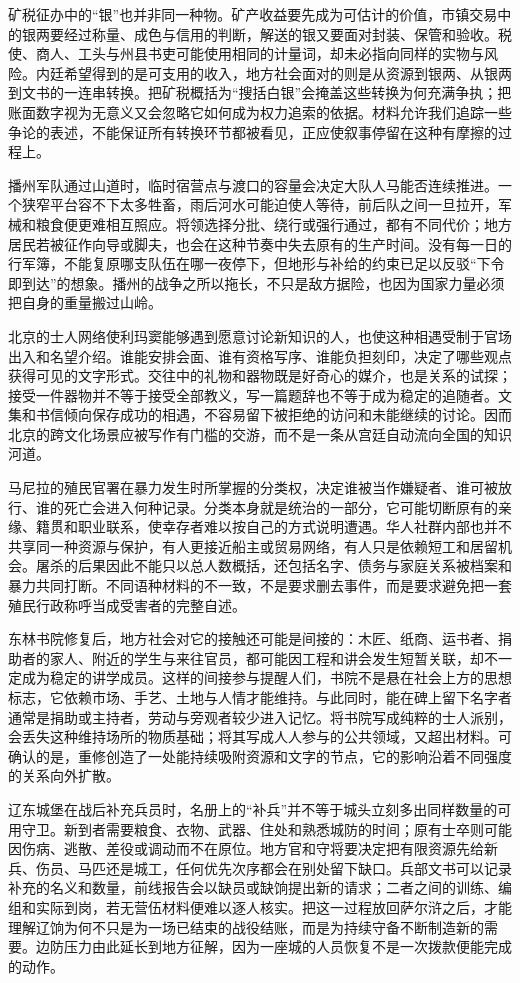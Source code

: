 矿税征办中的“银”也并非同一种物。矿产收益要先成为可估计的价值，市镇交易中的银两要经过称量、成色与信用的判断，解送的银又要面对封装、保管和验收。税使、商人、工头与州县书吏可能使用相同的计量词，却未必指向同样的实物与风险。内廷希望得到的是可支用的收入，地方社会面对的则是从资源到银两、从银两到文书的一连串转换。把矿税概括为“搜括白银”会掩盖这些转换为何充满争执；把账面数字视为无意义又会忽略它如何成为权力追索的依据。材料允许我们追踪一些争论的表述，不能保证所有转换环节都被看见，正应使叙事停留在这种有摩擦的过程上。

播州军队通过山道时，临时宿营点与渡口的容量会决定大队人马能否连续推进。一个狭窄平台容不下太多牲畜，雨后河水可能迫使人等待，前后队之间一旦拉开，军械和粮食便更难相互照应。将领选择分批、绕行或强行通过，都有不同代价；地方居民若被征作向导或脚夫，也会在这种节奏中失去原有的生产时间。没有每一日的行军簿，不能复原哪支队伍在哪一夜停下，但地形与补给的约束已足以反驳“下令即到达”的想象。播州的战争之所以拖长，不只是敌方据险，也因为国家力量必须把自身的重量搬过山岭。

北京的士人网络使利玛窦能够遇到愿意讨论新知识的人，也使这种相遇受制于官场出入和名望介绍。谁能安排会面、谁有资格写序、谁能负担刻印，决定了哪些观点获得可见的文字形式。交往中的礼物和器物既是好奇心的媒介，也是关系的试探；接受一件器物并不等于接受全部教义，写一篇题辞也不等于成为稳定的追随者。文集和书信倾向保存成功的相遇，不容易留下被拒绝的访问和未能继续的讨论。因而北京的跨文化场景应被写作有门槛的交游，而不是一条从宫廷自动流向全国的知识河道。

马尼拉的殖民官署在暴力发生时所掌握的分类权，决定谁被当作嫌疑者、谁可被放行、谁的死亡会进入何种记录。分类本身就是统治的一部分，它可能切断原有的亲缘、籍贯和职业联系，使幸存者难以按自己的方式说明遭遇。华人社群内部也并不共享同一种资源与保护，有人更接近船主或贸易网络，有人只是依赖短工和居留机会。屠杀的后果因此不能只以总人数概括，还包括名字、债务与家庭关系被档案和暴力共同打断。不同语种材料的不一致，不是要求删去事件，而是要求避免把一套殖民行政称呼当成受害者的完整自述。

东林书院修复后，地方社会对它的接触还可能是间接的：木匠、纸商、运书者、捐助者的家人、附近的学生与来往官员，都可能因工程和讲会发生短暂关联，却不一定成为稳定的讲学成员。这样的间接参与提醒人们，书院不是悬在社会上方的思想标志，它依赖市场、手艺、土地与人情才能维持。与此同时，能在碑上留下名字者通常是捐助或主持者，劳动与旁观者较少进入记忆。将书院写成纯粹的士人派别，会丢失这种维持场所的物质基础；将其写成人人参与的公共领域，又超出材料。可确认的是，重修创造了一处能持续吸附资源和文字的节点，它的影响沿着不同强度的关系向外扩散。

辽东城堡在战后补充兵员时，名册上的“补兵”并不等于城头立刻多出同样数量的可用守卫。新到者需要粮食、衣物、武器、住处和熟悉城防的时间；原有士卒则可能因伤病、逃散、差役或调动而不在原位。地方官和守将要决定把有限资源先给新兵、伤员、马匹还是城工，任何优先次序都会在别处留下缺口。兵部文书可以记录补充的名义和数量，前线报告会以缺员或缺饷提出新的请求；二者之间的训练、编组和实际到岗，若无营伍材料便难以逐人核实。把这一过程放回萨尔浒之后，才能理解辽饷为何不只是为一场已结束的战役结账，而是为持续守备不断制造新的需要。边防压力由此延长到地方征解，因为一座城的人员恢复不是一次拨款便能完成的动作。

